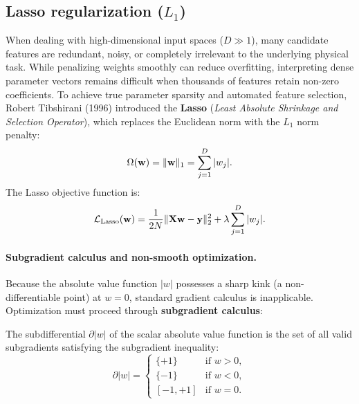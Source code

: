 \subsection{Lasso regularization ($L_1$)}
\label{sec:lasso_regression}

When dealing with high-dimensional input spaces ($D \gg 1$), many candidate features are redundant, noisy, or completely irrelevant to the underlying physical task. While penalizing weights smoothly can reduce overfitting, interpreting dense parameter vectors remains difficult when thousands of features retain non-zero coefficients. To achieve true parameter sparsity and automated feature selection, Robert Tibshirani (1996) introduced the \textbf{Lasso} (\textit{Least Absolute Shrinkage and Selection Operator}), which replaces the Euclidean norm with the $L_1$ norm penalty:
\begin{equation}
\Omega(\mathbf{w}) = \|\mathbf{w}\|_1 = \sum_{j=1}^D |w_j|.
\label{eq:l1_penalty}
\end{equation}
The Lasso objective function is:
\begin{equation}
\mathcal{L}_{\text{Lasso}}(\mathbf{w}) = \frac{1}{2N} \|\mathbf{X}\mathbf{w} - \mathbf{y}\|_2^2 + \lambda \sum_{j=1}^D |w_j|.
\label{eq:lasso_objective}
\end{equation}

\paragraph{Subgradient calculus and non-smooth optimization.}
Because the absolute value function $|w|$ possesses a sharp kink (a non-differentiable point) at $w = 0$, standard gradient calculus is inapplicable. Optimization must proceed through \textbf{subgradient calculus}:

\begin{definition}
The subdifferential $\partial |w|$ of the scalar absolute value function is the set of all valid subgradients satisfying the subgradient inequality:
\begin{equation}
\partial |w| = \begin{cases} \{+1\} & \text{if } w > 0, \\ \{-1\} & \text{if } w < 0, \\ [-1, +1] & \text{if } w = 0. \end{cases}
\label{eq:subdifferential_abs}
\end{equation}
\end{definition}

